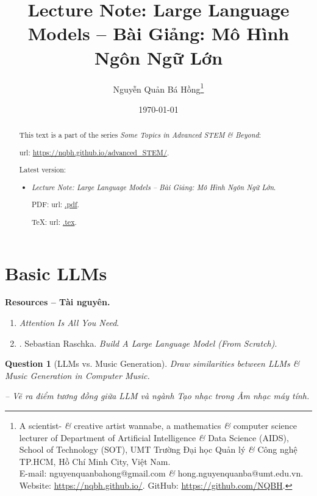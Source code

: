 \documentclass{article}
\title{Lecture Note: Large Language Models -- Bài Giảng: Mô Hình Ngôn Ngữ Lớn}
\author{Nguyễn Quản Bá Hồng\footnote{A scientist- {\it\&} creative artist wannabe, a mathematics {\it\&} computer science lecturer of Department of Artificial Intelligence {\it\&} Data Science (AIDS), School of Technology (SOT), UMT Trường Đại học Quản lý {\it\&} Công nghệ TP.HCM, Hồ Chí Minh City, Việt Nam.\\E-mail: {\sf nguyenquanbahong@gmail.com} {\it\&} {\sf hong.nguyenquanba@umt.edu.vn}. Website: \url{https://nqbh.github.io/}. GitHub: \url{https://github.com/NQBH}.}}
\date{\today}
\newtheorem{question}{Question}
\begin{document}
\maketitle
\begin{abstract}
	This text is a part of the series {\it Some Topics in Advanced STEM \& Beyond}:
	
	{\sc url}: \url{https://nqbh.github.io/advanced_STEM/}.
	
	Latest version:
	\begin{itemize}
		\item {\it Lecture Note: Large Language Models -- Bài Giảng: Mô Hình Ngôn Ngữ Lớn}.
		
		PDF: {\sc url}: \url{.pdf}.
		
		\TeX: {\sc url}: \url{.tex}.
	\end{itemize}
\end{abstract}
\tableofcontents


\section{Basic LLMs}
\textbf{\textsf{Resources -- Tài nguyên.}}
\begin{enumerate}
	\item {\it Attention Is All You Need}.
	
	\item \cite{Raschka2024}. {\sc Sebastian Raschka}. {\it Build A Large Language Model (From Scratch)}.
\end{enumerate}

\begin{question}[LLMs vs. Music Generation]
	Draw similarities between LLMs \& Music Generation in Computer Music.
	
	-- Vẽ ra điểm tương đồng giữa LLM và ngành Tạo nhạc trong Âm nhạc máy tính.
\end{question}
\end{document}

